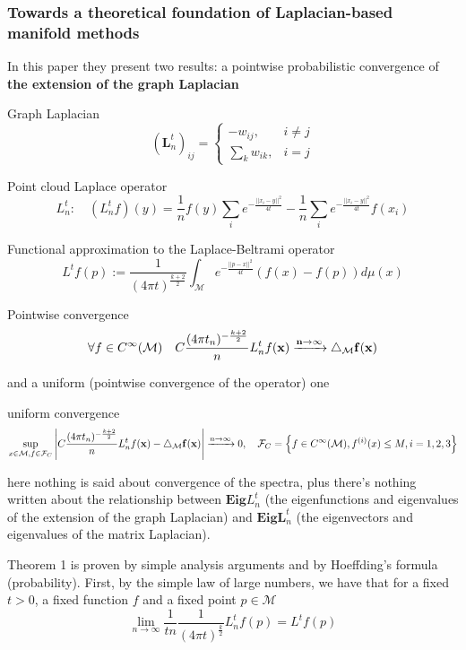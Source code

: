 \subsubsection{Towards a theoretical foundation of Laplacian-based manifold methods}
In this paper they present two results: a pointwise probabilistic convergence of \textbf{the extension of the graph Laplacian} 
\begin{definition}{Graph Laplacian}
	$$ \left(\mathbf L_n^t\right)_{ij}=\begin{cases}
	-w_{ij}, & i\neq j\\
	\sum_{k}w_{ik}, & i=j
	\end{cases}$$
\end{definition}
\begin{definition}{Point cloud Laplace operator}
	$$L_n^t:\quad(L_n^tf)(y) = \frac{1}{n}f(y)\sum_i e^{-\frac{||x_i-y||^2}{4t}}-\frac{1}{n}\sum_ie^{-\frac{||x_i-y||^2}{4t}}f(x_i)$$
\end{definition}
\begin{definition}{Functional approximation to the Laplace-Beltrami operator} \label{eq:L^t}
	$$L^tf(p) :=  \frac{1}{ (4\pi t)^{\frac{k+2}{2}}} \int_\mathcal Me^{-\frac{||p-x||^2}{4t}}\left(f(x)-f(p)\right)d\mu(x)$$
\end{definition}

\begin{theorem}{Pointwise convergence}
	$$\forall f \in C^\infty(\mathcal M)\quad  C\frac{(4\pi t_n)^{-\frac{k+2}{2}}}{n} L_n^t f(\bf x) \xrightarrow{n\to\infty}\triangle_\mathcal M f(\bf x)$$
\end{theorem}


and a uniform (pointwise convergence of the operator) one
\begin{theorem}{uniform convergence}
	$$\sup_{x\in\mathcal M, f\in \mathcal F_C}\left| C\frac{(4\pi t_n)^{-\frac{k+2}{2}}}{n} L_n^t f(\bf x) - \triangle_\mathcal M f(\bf x) \right|\xrightarrow{n\to\infty}0
	, \quad \mathcal F_C = \left\{f\in C^\infty(\mathcal M), f^{(i)}(x)\leq M, i=1,2,3\right\}$$
\end{theorem}


here nothing is said about convergence of the spectra, plus there's nothing written about the relationship between $\mathbf{Eig} L_n^t$ (the eigenfunctions and eigenvalues of the extension of the graph Laplacian) and $\mathbf {Eig} \mathbf {L}_n^t$ (the eigenvectors and eigenvalues of the matrix Laplacian).

Theorem 1 is proven by simple analysis arguments and by Hoeffding's formula (probability). 
First, by the simple law of large numbers, we have that for a fixed $t>0$, a fixed function $f$ and a fixed point $p\in\mathcal M$
\begin{equation}\label{eq:pointwise convergence of laplacian discrete approximation}
	\lim_{n\to\infty}\frac{1}{tn}\frac{1}{ (4\pi t)^{\frac{k}{2}}}L_n^tf(p)= L^tf(p)
\end{equation}




